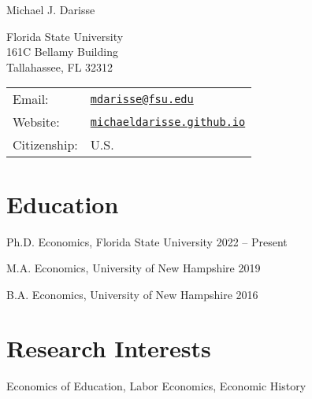 \documentclass[letterpaper]{article}
\def\name{Michael J. Darisse}
\renewenvironment{itemize}{
  \begin{list}{}{
    \setlength{\leftmargin}{1.5em}
  }
}{
  \end{list}
}
\begin{document}
{\huge \name}


\vspace{0.25in}

\begin{minipage}{0.45\linewidth}
  Florida State University \\
  161C Bellamy Building \\
  Tallahassee, FL 32312 \\
\end{minipage}
\begin{minipage}{0.45\linewidth}
  \begin{tabular}{ll}
    Email: & \href{mailto:mdarisse@fsu.edu}{\tt mdarisse@fsu.edu} \\
    Website: & \href{http://michaeldarisse.github.io/}{\tt michaeldarisse.github.io} \\
    Citizenship: & U.S. \\
  \end{tabular}
\end{minipage}


\section*{Education}

\begin{itemize}
  \item Ph.D. Economics, Florida State University  \hfill 2022 -- Present 
  \item M.A. Economics, University of New Hampshire \hfill 2019 
  \item B.A. Economics, University of New Hampshire \hfill 2016 
\end{itemize}



\section*{Research Interests}

\begin{itemize}
    \item Economics of Education, Labor Economics, Economic History
\end{itemize}
\end{document}
